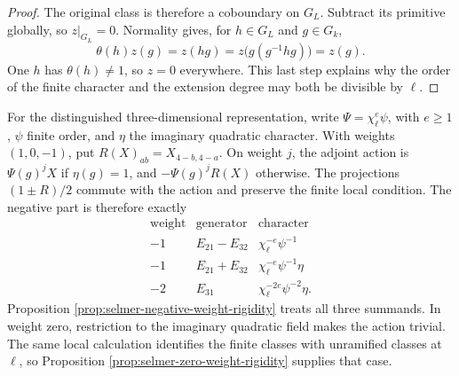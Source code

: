 \begin{proof}
The original class is therefore a coboundary on \(G_L\).
Subtract its primitive globally, so \(z|_{G_L}=0\). Normality gives,
for \(h\in G_L\) and \(g\in G_k\),
\[
  \theta(h)z(g)=z(hg)=z\bigl(g(g^{-1}hg)\bigr)=z(g).
\]
One \(h\) has \(\theta(h)\ne1\), so \(z=0\) everywhere. This last
step explains why the order of the finite character and the extension
degree may both be divisible by \(\ell\).
\end{proof}

For the distinguished three-dimensional representation, write
\(\Psi=\chi_\ell^e\psi\), with \(e\ge1\), \(\psi\) finite order,
and \(\eta\) the imaginary quadratic character. With weights
\((1,0,-1)\), put \(R(X)_{ab}=X_{4-b,4-a}\). On weight \(j\),
the adjoint action is \(\Psi(g)^jX\) if \(\eta(g)=1\), and
\(-\Psi(g)^jR(X)\) otherwise. The projections
\((1\pm R)/2\) commute with the action and preserve the finite
local condition. The negative part is therefore exactly
\[
\begin{array}{c|c|c}
 \text{weight}&\text{generator}&\text{character}\\ \hline
 -1&E_{21}-E_{32}&\chi_\ell^{-e}\psi^{-1}\\
 -1&E_{21}+E_{32}&\chi_\ell^{-e}\psi^{-1}\eta\\
 -2&E_{31}&\chi_\ell^{-2e}\psi^{-2}\eta .
\end{array}
\]
Proposition \ref{prop:selmer-negative-weight-rigidity} treats all
three summands. In weight zero, restriction to the imaginary quadratic
field makes the action trivial. The same local calculation identifies
the finite classes with unramified classes at \(\ell\), so Proposition
\ref{prop:selmer-zero-weight-rigidity} supplies that case.


